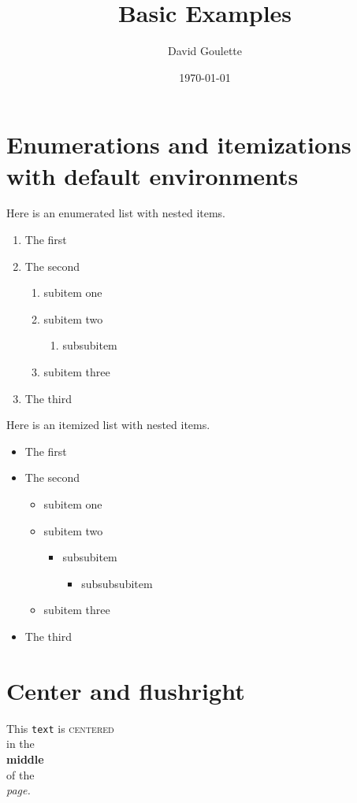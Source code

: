 \documentclass{article}
\author{David Goulette}
\date{\today}
\title{Basic Examples}
\begin{document}
\maketitle
\section{Enumerations and itemizations with default environments}
Here is an enumerated list with nested items. 
\begin{enumerate}
\item The first
\item The second
\begin{enumerate}
\item subitem one
\item subitem two
\begin{enumerate}
\item subsubitem
\end{enumerate}
\item subitem three
\end{enumerate}
\item The third
\end{enumerate}

Here is an itemized list with nested items.

\begin{itemize}
\item The first
\item The second
\begin{itemize}
\item subitem one
\item subitem two
\begin{itemize}
\item subsubitem
\begin{itemize}
\item subsubsubitem
\end{itemize}
\end{itemize}
\item subitem three
\end{itemize}
\item The third
\end{itemize}

\section{Center and flushright}
\begin{center}
This \texttt{text} is \textsc{centered}\\ in the\\ \textbf{middle}\\ of the\\ \textsl{page.}
\end{center}
\end{document}
